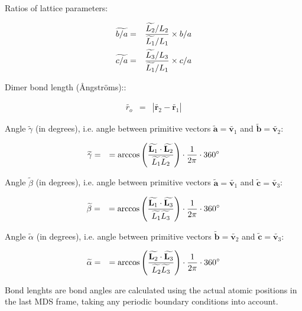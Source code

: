 \documentclass[a4paper,12pt,pdftex,onecolumn]{article}
\begin{document}
Ratios of lattice parameters:

\begin{eqnarray}
\widetilde{b/a} &=& { \widetilde{L_2}/L_2 \over \widetilde{L_1}/L_1 } \times b/a \\
\widetilde{c/a} &=& { \widetilde{L_3}/L_3 \over \widetilde{L_1}/L_1 } \times c/a
\end{eqnarray}

Dimer bond length (\AA{}ngstr\"oms)::

\begin{eqnarray}
\widetilde{r_o} &=& | \widetilde{\mathbf{r}_2} - \widetilde{\mathbf{r}_1} |
\end{eqnarray}

Angle $\widetilde{\gamma}$ (in degrees), i.e.
angle between primitive vectors
$\widetilde{\mathbf{a}} = \widetilde{\mathbf{v}_1}$ and
$\widetilde{\mathbf{b}} = \widetilde{\mathbf{v}_2}$:

\begin{eqnarray}
\widetilde{\gamma} &=&
= \arccos \left(
{ \widetilde{\mathbf{L}_1} \cdot \widetilde{\mathbf{L}_2} \over \widetilde{L_1} \widetilde{L_2} }
\right) \cdot {1\over 2\pi} \cdot 360^\circ
\end{eqnarray}

Angle $\widetilde{\beta}$ (in degrees), i.e.
angle between primitive vectors
$\widetilde{\mathbf{a}} = \widetilde{\mathbf{v}_1}$ and
$\widetilde{\mathbf{c}} = \widetilde{\mathbf{v}_3}$:

\begin{eqnarray}
\widetilde{\beta} &=&
= \arccos \left(
{ \widetilde{\mathbf{L}_1} \cdot \widetilde{\mathbf{L}_3} \over \widetilde{L_1} \widetilde{L_3} }
\right) \cdot {1\over 2\pi} \cdot 360^\circ
\end{eqnarray}

Angle $\widetilde{\alpha}$ (in degrees), i.e.
angle between primitive vectors
$\widetilde{\mathbf{b}} = \widetilde{\mathbf{v}_2}$ and
$\widetilde{\mathbf{c}} = \widetilde{\mathbf{v}_3}$:

\begin{eqnarray}
\widetilde{\alpha} &=&
= \arccos \left(
{ \widetilde{\mathbf{L}_2} \cdot \widetilde{\mathbf{L}_3} \over \widetilde{L_2} \widetilde{L_3} }
\right) \cdot {1\over 2\pi} \cdot 360^\circ
\end{eqnarray}

Bond lenghts are bond angles are calculated using the actual atomic positions
in the last MDS frame, taking any periodic boundary conditions into account.
\end{document}
